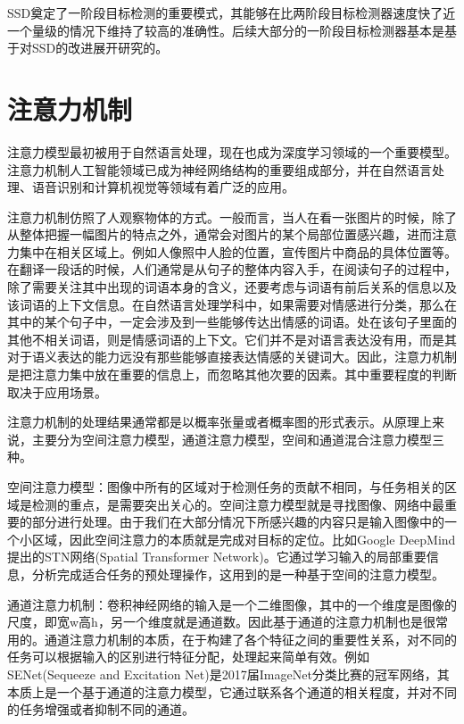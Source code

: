 SSD奠定了一阶段目标检测的重要模式，其能够在比两阶段目标检测器速度快了近一个量级的情况下维持了较高的准确性。后续大部分的一阶段目标检测器基本是基于对SSD的改进展开研究的。

\section{注意力机制}

注意力模型最初被用于自然语言处理，现在也成为深度学习领域的一个重要模型。注意力机制人工智能领域已成为神经网络结构的重要组成部分，并在自然语言处理、语音识别和计算机视觉等领域有着广泛的应用。

注意力机制仿照了人观察物体的方式。一般而言，当人在看一张图片的时候，除了从整体把握一幅图片的特点之外，通常会对图片的某个局部位置感兴趣，进而注意力集中在相关区域上。例如人像照中人脸的位置，宣传图片中商品的具体位置等。
在翻译一段话的时候，人们通常是从句子的整体内容入手，在阅读句子的过程中，除了需要关注其中出现的词语本身的含义，还要考虑与词语有前后关系的信息以及该词语的上下文信息。在自然语言处理学科中，如果需要对情感进行分类，那么在其中的某个句子中，一定会涉及到一些能够传达出情感的词语。处在该句子里面的其他不相关词语，则是情感词语的上下文。它们并不是对语言表达没有用，而是其对于语义表达的能力远没有那些能够直接表达情感的关键词大。因此，注意力机制是把注意力集中放在重要的信息上，而忽略其他次要的因素。其中重要程度的判断取决于应用场景。%

注意力机制的处理结果通常都是以概率张量或者概率图的形式表示。从原理上来说，主要分为空间注意力模型，通道注意力模型，空间和通道混合注意力模型三种。

空间注意力模型：图像中所有的区域对于检测任务的贡献不相同，与任务相关的区域是检测的重点，是需要突出关心的。空间注意力模型就是寻找图像、网络中最重要的部分进行处理。由于我们在大部分情况下所感兴趣的内容只是输入图像中的一个小区域，因此空间注意力的本质就是完成对目标的定位。比如Google DeepMind提出的STN网络(Spatial Transformer Network)\cite{STN}。它通过学习输入的局部重要信息，分析完成适合任务的预处理操作，这用到的是一种基于空间的注意力模型。

通道注意力机制：卷积神经网络的输入是一个二维图像，其中的一个维度是图像的尺度，即宽w高h，另一个维度就是通道数。因此基于通道的注意力机制也是很常用的。通道注意力机制的本质，在于构建了各个特征之间的重要性关系，对不同的任务可以根据输入的区别进行特征分配，处理起来简单有效。例如SENet(Sequeeze and Excitation Net)\cite{SENet}是2017届ImageNet分类比赛的冠军网络，其本质上是一个基于通道的注意力模型，它通过联系各个通道的相关程度，并对不同的任务增强或者抑制不同的通道。

